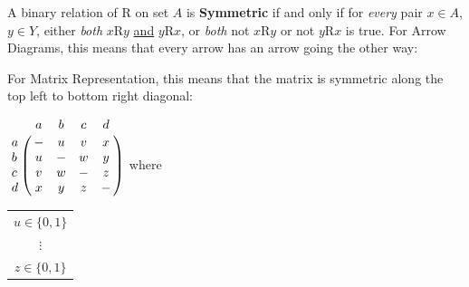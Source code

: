 A binary relation of R on set $A$ is \textbf{Symmetric} if and only if for \textit{every} pair $x \in A$, $y \in Y$,
either \textit{both} $x$R$y$ \underline{and} $y$R$x$, or \textit{both} not $x$R$y$ or not $y$R$x$ is true.
For Arrow Diagrams, this means that every arrow has an arrow going the other way:
\begin{center}
\end{center}
For Matrix Representation, this means that the matrix is symmetric along the top left to bottom right diagonal:
\begin{center}
  $
    \bordermatrix{ & a & b & c & d \cr
      a & - & u & v & x \cr
      b & u & - & w & y \cr
      c & v & w & - & z \cr
      d & x & y & z & - \cr }
  $
  where
  \begin{tabular}{c}
    $u \in \{0,1\}$ \\
    $\vdots$        \\
    $z \in \{0,1\}$
  \end{tabular}
\end{center}

